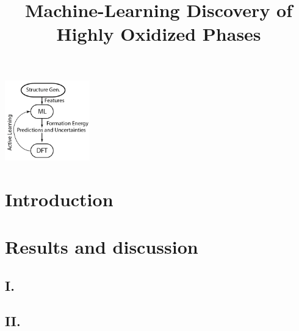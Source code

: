 \documentclass[journal=jacsat,manuscript=article]{achemso}
\title[ML discovered IrOx phases]{
  Machine-Learning Discovery of Highly Oxidized \ce{IrO_x} Phases}
\begin{document}
\begin{tocentry}
\begin{center}
\includegraphics[height=3.5cm]{02_figures/Surrogate_model}
\end{center}
\end{tocentry}


\begin{abstract}

\end{abstract}

\section{Introduction}


\section{Results and discussion}

  \subsection{I. }
  

  \subsection{II. }
  
\end{document}
